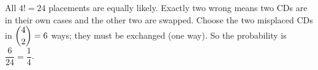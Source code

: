 All $4!=24$ placements are equally likely. Exactly two wrong means two CDs are in their own cases and the other two are swapped. Choose the two misplaced CDs in $\dbinom42=6$ ways; they must be exchanged (one way). So the probability is $\dfrac{6}{24}=\boxed{\dfrac{1}{4}}$.
